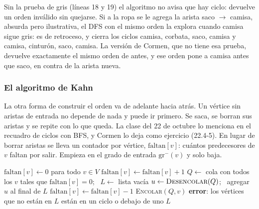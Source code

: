 \documentclass[11pt,letterpaper]{article}
\begin{document}
\begin{ojo}
  Sin la prueba de gris (líneas 18 y 19) el algoritmo no avisa que hay
  ciclo: devuelve un orden inválido sin quejarse. Si a la ropa se le
  agrega la arista saco $\to$ camisa, absurda pero ilustrativa, el DFS
  con el mismo orden la explora cuando camisa sigue gris: es de
  retroceso, y cierra los ciclos camisa, corbata, saco, camisa y
  camisa, cinturón, saco, camisa. La versión de Cormen, que no tiene
  esa prueba, devuelve exactamente el mismo orden de antes, y ese orden
  pone a camisa antes que saco, en contra de la arista nueva.
\end{ojo}

\subsubsection*{El algoritmo de Kahn}

La otra forma de construir el orden va de adelante hacia atrás. Un
vértice sin aristas de entrada no depende de nada y puede ir primero.
Se saca, se borran sus aristas y se repite con lo que queda. La clase
del 22 de octubre lo menciona en el recuadro de ciclos con BFS, y
Cormen lo deja como ejercicio (22.4-5). En lugar de borrar aristas se
lleva un contador por vértice, $\text{faltan}[v]$: cuántos predecesores
de $v$ faltan por salir. Empieza en el grado de entrada
$\text{gr}^{-}(v)$ y solo baja.

\begin{algorithm}[H]
\caption{\textsc{Kahn}$(G)$, orden topológico por grados de entrada}
\label{alg:kahn}
\begin{algorithmic}[1]
  \State $\text{faltan}[v] \gets 0$ para todo $v \in V$
      \State $\text{faltan}[v] \gets \text{faltan}[v] + 1$
    \EndFor
  \EndFor
  \State $Q \gets$ cola con todos los $v$ tales que
         $\text{faltan}[v] = 0$; \ $L \gets$ lista vacía
    \State $u \gets \textsc{Desencolar}(Q)$; \ agregar $u$ al final
           de $L$
      \State $\text{faltan}[v] \gets \text{faltan}[v] - 1$
        \State \textsc{Encolar}$(Q, v)$
      \EndIf
    \EndFor
  \EndWhile
    \State \textbf{error}: los vértices que no están en $L$ están en un
           ciclo o debajo de uno
  \EndIf
  \State \Return $L$
\EndProcedure
\end{algorithmic}
\end{algorithm}
\end{document}
